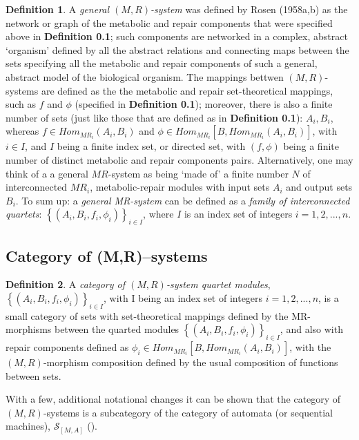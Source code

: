 \documentclass[12pt]{article}
\theoremstyle{plain}
\theoremstyle{definition}
\newtheorem{definition}{Definition}[section]
\numberwithin{equation}{section}
\begin{document}
\begin{definition} 
A \emph{general $(M,R)$-system} was defined by Rosen (1958a,b) as the network or graph of the metabolic and repair components that were specified above in \textbf{Definition 0.1}; such components are networked in a complex, abstract `organism' defined by all the abstract relations and connecting maps between the sets specifying all the metabolic and repair components of such a general, abstract model of the biological organism. The mappings bettwen 
$(M,R)$-systems are defined as the the metabolic and repair set-theoretical mappings, such as $f$ and $\phi$ (specified in \textbf{Definition 0.1}); moreover, there is also a finite number of sets (just like those that are defined as in \textbf{Definition 0.1}): $A_i, B_i$, whereas $f \in Hom_{MR_i}(A_i,B_i)$ and 
$\phi \in Hom_{MR_i}[B, Hom_{MR_i}(A_i,B_i)]$,  with $i \in I$, and $I$ being a finite index set, or directed set, with $(f,\phi)$ being a finite number of distinct metabolic and repair components pairs. Alternatively, one may think of a a general $MR$-system as being `made of' a finite number $N$ of interconnected $MR_i$, metabolic-repair modules with input sets $A_i$ and output sets $B_i$. To sum up: 
a \emph{general MR-system} can be defined as a \emph{family of interconnected quartets}:
$\left\{(A_i, B_i, f_i, \phi_i)\right\}_{i \in I}$, where $I$ is an index set of integers $i=1, 2, ..., n$.
\end{definition}

\subsection{Category of (M,R)--systems}

\begin{definition}
 
 A \emph{category of $(M,R)$-system quartet modules}, $\left\{(A_i, B_i, f_i, \phi_i)\right\}_{i \in I}$, with I being an index set of integers $i=1,2,..., n$, is a small category of sets with set-theoretical mappings defined by the MR-morphisms between the quarted modules $\left\{(A_i, B_i, f_i, \phi_i)\right\}_{i \in I}$, and also with repair components defined as $\phi_i \in Hom_{MR_i}[B, Hom_{MR_i}(A_i,B_i)]$, with the $(M,R)$-morphism composition defined by the usual composition of functions between sets.  

 With a few, additional notational changes it can be shown that the category of $(M,R)$-systems  
is a subcategory of the category of automata (or sequential machines), $\mathcal{S}_{[M,A]}$ (\cite{ICB73, ICBM74}).
\end{definition}
\end{document}

